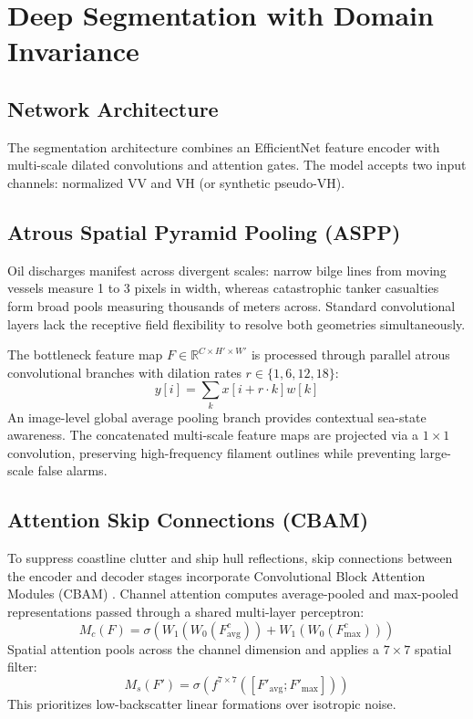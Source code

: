 \documentclass[conference]{IEEEtran}
\begin{document}
\section{Deep Segmentation with Domain Invariance}

\subsection{Network Architecture}
The segmentation architecture combines an EfficientNet feature encoder with multi-scale dilated convolutions and attention gates. The model accepts two input channels: normalized VV and VH (or synthetic pseudo-VH).

\subsection{Atrous Spatial Pyramid Pooling (ASPP)}
Oil discharges manifest across divergent scales: narrow bilge lines from moving vessels measure 1 to 3 pixels in width, whereas catastrophic tanker casualties form broad pools measuring thousands of meters across. Standard convolutional layers lack the receptive field flexibility to resolve both geometries simultaneously.

The bottleneck feature map $F \in \mathbb{R}^{C \times H' \times W'}$ is processed through parallel atrous convolutional branches with dilation rates $r \in \{1, 6, 12, 18\}$:
\begin{equation}
y[i] = \sum_k x[i + r \cdot k] w[k]
\label{eq:atrous_conv}
\end{equation}
An image-level global average pooling branch provides contextual sea-state awareness. The concatenated multi-scale feature maps are projected via a $1 \times 1$ convolution, preserving high-frequency filament outlines while preventing large-scale false alarms.

\subsection{Attention Skip Connections (CBAM)}
To suppress coastline clutter and ship hull reflections, skip connections between the encoder and decoder stages incorporate Convolutional Block Attention Modules (CBAM) \cite{woo2018cbam}. Channel attention computes average-pooled and max-pooled representations passed through a shared multi-layer perceptron:
\begin{equation}
M_c(F) = \sigma\left(W_1(W_0(F_{\text{avg}}^c)) + W_1(W_0(F_{\text{max}}^c))\right)
\label{eq:channel_att}
\end{equation}
Spatial attention pools across the channel dimension and applies a $7 \times 7$ spatial filter:
\begin{equation}
M_s(F') = \sigma\left(f^{7\times7}([F'_{\text{avg}}; F'_{\text{max}}])\right)
\label{eq:spatial_att}
\end{equation}
This prioritizes low-backscatter linear formations over isotropic noise.
\end{document}
